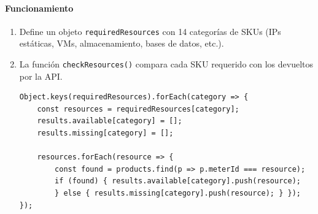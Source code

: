 \paragraph{Funcionamiento}
\begin{enumerate}
    \item Define un objeto \texttt{requiredResources} con 14 categorías de SKUs (IPs estáticas, VMs, almacenamiento, bases de datos, etc.).
    \item La función \texttt{checkResources()} compara cada SKU requerido con los devueltos por la API.
          \begin{lstlisting}[caption=Verificación de categorías, label=lst:verificacion-categorias]
Object.keys(requiredResources).forEach(category => {
    const resources = requiredResources[category];
    results.available[category] = [];
    results.missing[category] = [];
    
    resources.forEach(resource => {
        const found = products.find(p => p.meterId === resource);
        if (found) { results.available[category].push(resource);
        } else { results.missing[category].push(resource); } }); });


\end{lstlisting}
\end{enumerate}
